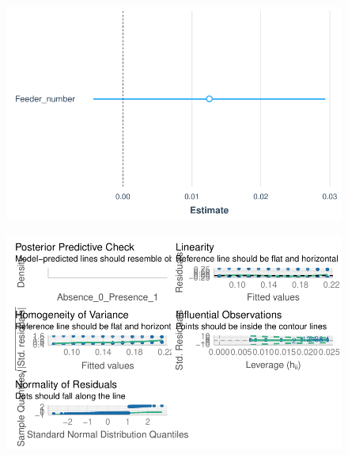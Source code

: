 \documentclass[
  letterpaper,
  DIV=11,
  numbers=noendperiod]{scrartcl}
\newenvironment{Shaded}{}{}
\newcommand{\CommentTok}[1]{\textcolor[rgb]{0.42,0.45,0.49}{#1}}
\newcommand{\FunctionTok}[1]{\textcolor[rgb]{0.44,0.26,0.76}{#1}}
\newcommand{\NormalTok}[1]{\textcolor[rgb]{0.14,0.16,0.18}{#1}}
\newcommand{\SpecialCharTok}[1]{\textcolor[rgb]{0.00,0.36,0.77}{#1}}
\begin{document}
\begin{figure}[H]

{\centering \includegraphics{Supplementary_Material_files/figure-pdf/unnamed-chunk-4-1.pdf}

}

\end{figure}

\begin{Shaded}
\end{Shaded}

\begin{figure}[H]

{\centering \includegraphics{Supplementary_Material_files/figure-pdf/unnamed-chunk-4-2.pdf}

}

\end{figure}
\end{document}
